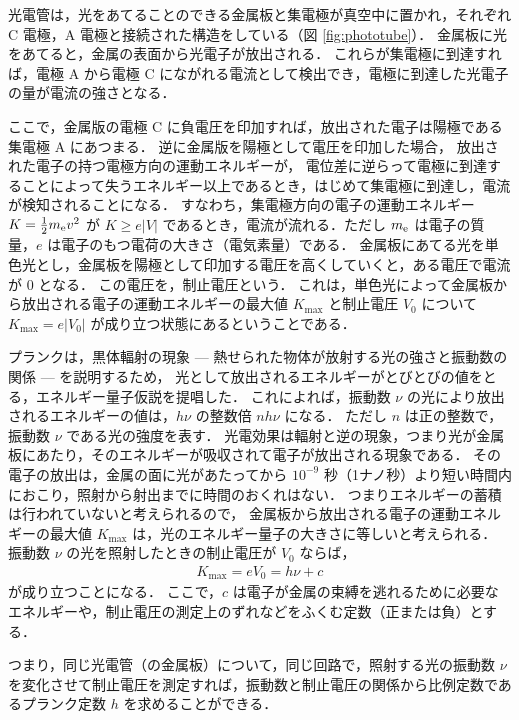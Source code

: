 \documentclass[11pt,sort]{jarticle}
\begin{document}
光電管は，光をあてることのできる金属板と集電極が真空中に置かれ，それぞれ C 電極，A 電極と接続された構造をしている（図 \ref{fig:phototube}）．
金属板に光をあてると，金属の表面から光電子が放出される．
これらが集電極に到達すれば，電極 A から電極 C にながれる電流として検出でき，電極に到達した光電子の量が電流の強さとなる．

ここで，金属版の電極 C に負電圧を印加すれば，放出された電子は陽極である集電極 A にあつまる．
逆に金属版を陽極として電圧を印加した場合，
放出された電子の持つ電極方向の運動エネルギーが，
電位差に逆らって電極に到達することによって失うエネルギー以上であるとき，はじめて集電極に到達し，電流が検知されることになる．
すなわち，集電極方向の電子の運動エネルギー $K = \frac{1}{2}m_{\rm e} v^2$ が $K \geq e |V|$ であるとき，電流が流れる．ただし $m_{\rm e}$ は電子の質量，$e$ は電子のもつ電荷の大きさ（電気素量）である．
金属板にあてる光を単色光とし，金属板を陽極として印加する電圧を高くしていくと，ある電圧で電流が 0 となる．
この電圧を，制止電圧という．
これは，単色光によって金属板から放出される電子の運動エネルギーの最大値 $K_{\max}$ と制止電圧 $V_0$ について $K_{\max} = e |V_0|$ が成り立つ状態にあるということである．

プランクは，黒体輻射の現象 --- 
熱せられた物体が放射する光の強さと振動数の関係 --- を説明するため，
光として放出されるエネルギーがとびとびの値をとる，エネルギー量子仮説を提唱した．
これによれば，振動数 $\nu$ の光により放出されるエネルギーの値は，$h \nu$ の整数倍 $n h \nu$ になる．
ただし $n$ は正の整数で，振動数 $\nu$ である光の強度を表す．
光電効果は輻射と逆の現象，つまり光が金属板にあたり，そのエネルギーが吸収されて電子が放出される現象である．
その電子の放出は，金属の面に光があたってから $10^{-9}$ 秒（1ナノ秒）より短い時間内におこり，照射から射出までに時間のおくれはない\cite{Aya-}．
つまりエネルギーの蓄積は行われていないと考えられるので，
金属板から放出される電子の運動エネルギーの最大値 $K_{\max}$ は，光のエネルギー量子の大きさに等しいと考えられる．
振動数 $\nu$ の光を照射したときの制止電圧が $V_0$ ならば，
\begin{eqnarray}\label{eq:1}
K_{\max} = e V_0 = h \nu + c
\end{eqnarray}
が成り立つことになる．
ここで，$c$ は電子が金属の束縛を逃れるために必要なエネルギーや，制止電圧の測定上のずれなどをふくむ定数（正または負）とする．

つまり，同じ光電管（の金属板）について，同じ回路で，照射する光の振動数 $\nu$ を変化させて制止電圧を測定すれば，振動数と制止電圧の関係から比例定数であるプランク定数 $h$ を求めることができる．
\end{document}
